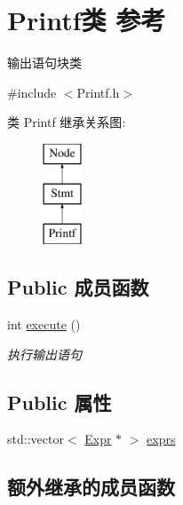 \hypertarget{class_printf}{}\section{Printf类 参考}
\label{class_printf}


输出语句块类  




{\ttfamily \#include $<$Printf.\+h$>$}

类 Printf 继承关系图\+:\begin{figure}[H]
\begin{center}
\leavevmode
\includegraphics[height=3.000000cm]{class_printf}
\end{center}
\end{figure}
\subsection*{Public 成员函数}
\begin{DoxyCompactItemize}
\item 
int \hyperlink{class_printf_a0343199e28647ced40b9d74a284ff5f3}{execute} ()\hypertarget{class_printf_a0343199e28647ced40b9d74a284ff5f3}{}\label{class_printf_a0343199e28647ced40b9d74a284ff5f3}

\begin{DoxyCompactList}\small\item\em 执行输出语句 \end{DoxyCompactList}\end{DoxyCompactItemize}
\subsection*{Public 属性}
\begin{DoxyCompactItemize}
\item 
std\+::vector$<$ \hyperlink{class_expr}{Expr} $\ast$ $>$ \hyperlink{class_printf_ab07a181eb9cd79c9018e172332d44ce5}{exprs}
\end{DoxyCompactItemize}
\subsection*{额外继承的成员函数}



